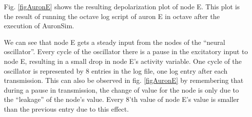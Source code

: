 	Fig. \ref{figAuronE} shows the resulting depolarization plot of node E. 
	This plot is the result of running the octave log script of auron E in octave after the execution of AuronSim.

	We can see that node E gets a steady input from the nodes of the ``neural oscillator''.
	Every cycle of the oscillator there is a pause in the excitatory input to node E, resulting in a small drop in node E's activity variable. 
	One cycle of the oscillator is represented by 8 entries in the log file, one log entry after each transmission.
	This can also be observed in fig. \ref{figAuronE} by remembering that during a pause in transmission, the change of value for the node is only due to the ``leakage'' of the node's value.
	Every 8'th value of node E's value is smaller than the previous entry due to this effect.



